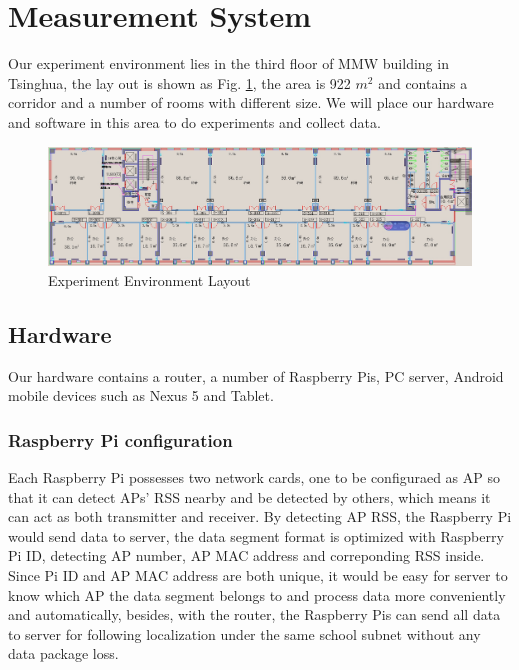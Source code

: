 \documentclass[10pt,conference]{IEEEtran}
\begin{document}

\section{Measurement System}
Our experiment environment lies in the third floor of MMW building in Tsinghua, the lay out is shown as Fig. \ref{layout}, the area is 922 $m^2$ and contains a corridor and a number of rooms with different size. We will place our hardware and software in this area to do experiments and collect data.

\begin{figure}[htbp]
\centering
\includegraphics[scale=.3]{3floor} 
\caption{Experiment Environment Layout}\label{layout}
\end{figure}

\subsection{Hardware}
Our hardware contains a router, a number of Raspberry Pis, PC server, Android mobile devices such as Nexus 5 and Tablet. 

\subsubsection{Raspberry Pi configuration}
Each Raspberry Pi possesses two network cards, one to be configuraed as AP so that it can detect APs' RSS nearby and be detected by others, which means it can act as both transmitter and receiver. By detecting AP RSS, the Raspberry Pi would send data to server, the data segment format is optimized with Raspberry Pi ID, detecting AP number, AP MAC address and correponding RSS inside. Since Pi ID and AP MAC address are both unique, it would be easy for server to know which AP the data segment belongs to and process data more conveniently and automatically, besides, with the router, the Raspberry Pis can send all data to server for following localization under the same school subnet without any data package loss.
\end{document}
